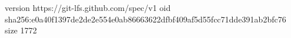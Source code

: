 version https://git-lfs.github.com/spec/v1
oid sha256:e0a40f1397de2de2e554e0ab86663622dfbf409af5d55fcc71dde391ab2bfc76
size 1772
